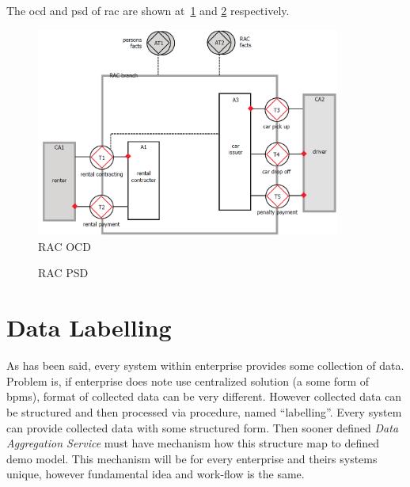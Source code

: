 The \gls{ocd} and \gls{psd} of \gls{rac} are shown at~\cref{fig:rac-ocd} and \cref{fig:rac-psd} respectively.
\begin{figure}[ht!]
\centering
\includegraphics[width=10cm,keepaspectratio]{img/rac-ocd}
\caption{RAC OCD}
\label{fig:rac-ocd}
\end{figure}

\begin{figure}[ht!]
 \centering
 \qquad
 \caption{RAC PSD}%
 \label{fig:rac-psd}%
\end{figure}
\newpage
\section{Data Labelling}
As has been said, every system within enterprise provides some collection of data. Problem is, if enterprise does note use centralized solution (a some form of \gls{bpms}), format of collected data can be very different. 
However collected data can be structured and then processed via procedure, named ``labelling''. Every system can provide collected data with some structured form. Then sooner defined \textit{Data Aggregation Service} must have mechanism how this structure map to defined \gls{demo} model. This mechanism will be for every enterprise and theirs systems unique, however fundamental idea and work-flow is the same.


